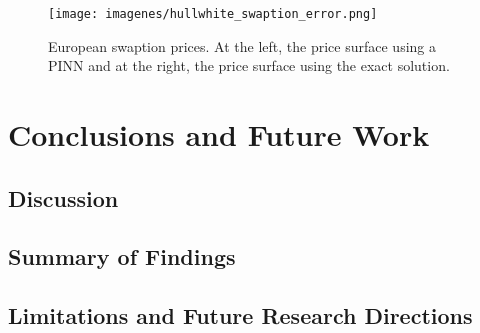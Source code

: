 \documentclass[12pt]{report} %
\theoremstyle{plain}           %
\theoremstyle{definition}      %
\theoremstyle{remark}          %
\begin{document}
\begin{figure}
	\centering
	\texttt{[image: imagenes/hullwhite\_swaption\_error.png]}
	\caption{European swaption prices. At the left, the price surface using a PINN and at the right, the price surface using the exact solution.}
	\label{fig:swaption_error}
\end{figure}

\chapter{Conclusions and Future Work}
\section{Discussion}
\section{Summary of Findings}
\section{Limitations and Future Research Directions}


\clearpage
{}

\printbibliography
\end{document}
